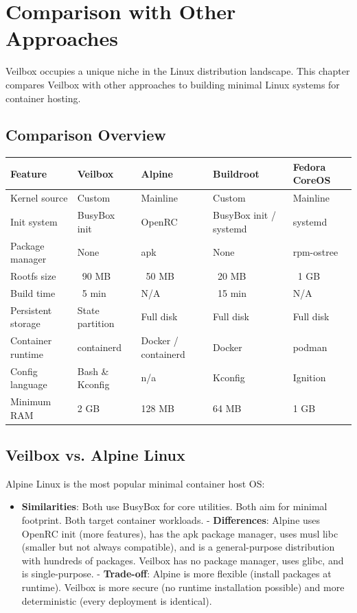 \chapter{Comparison with Other Approaches}
\label{ch:comparison}

Veilbox occupies a unique niche in the Linux distribution landscape. This
chapter compares Veilbox with other approaches to building minimal Linux
systems for container hosting.

\section{Comparison Overview}

\begin{longtable}{|p{3cm}|p{3cm}|p{3cm}|p{3cm}|p{3cm}|}
\hline
\textbf{Feature} & \textbf{Veilbox} & \textbf{Alpine} & \textbf{Buildroot} & \textbf{Fedora CoreOS} \\
\hline
Kernel source & Custom & Mainline & Custom & Mainline \\
Init system & BusyBox init & OpenRC & BusyBox init / systemd & systemd \\
Package manager & None & apk & None & rpm-ostree \\
Rootfs size & ~90 MB & ~50 MB & ~20 MB & ~1 GB \\
Build time & ~5 min & N/A & ~15 min & N/A \\
Persistent storage & State partition & Full disk & Full disk & Full disk \\
Container runtime & containerd & Docker / containerd & Docker & podman \\
Config language & Bash \& Kconfig & n/a & Kconfig & Ignition \\
Minimum RAM & 2 GB & 128 MB & 64 MB & 1 GB \\
\hline
\end{longtable}

\section{Veilbox vs. Alpine Linux}

Alpine Linux is the most popular minimal container host OS:

\begin{itemize}[nosep]
  \item \textbf{Similarities}: Both use BusyBox for core utilities. Both
        aim for minimal footprint. Both target container workloads.
  - \textbf{Differences}: Alpine uses OpenRC init (more features), has
        the apk package manager, uses musl libc (smaller but not always
        compatible), and is a general-purpose distribution with hundreds
        of packages. Veilbox has no package manager, uses glibc, and is
        single-purpose.
  - \textbf{Trade-off}: Alpine is more flexible (install packages at
        runtime). Veilbox is more secure (no runtime installation
        possible) and more deterministic (every deployment is identical).
\end{itemize}

